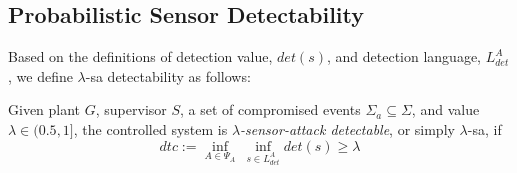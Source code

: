

\subsection{Probabilistic Sensor Detectability}
Based on the definitions of detection value, $det(s)$, and detection language, $L_{det}^A$, we define $\lambda$-sa detectability as follows:

\begin{definition}\label{def:lambda-sa-det}
Given plant $G$, supervisor $S$, a set of compromised events $\Sigma_a\subseteq \Sigma$, and value $\lambda \in (0.5,1]$, the controlled system is \emph{$\lambda$-sensor-attack detectable}, or simply $\lambda$-sa, if
\begin{equation}
dtc:=\inf_{A\in \Psi_A}\ \inf_{s\in L^A_{det}} det(s)\geq \lambda\label{eq:likelihood}
\end{equation}
\end{definition}

